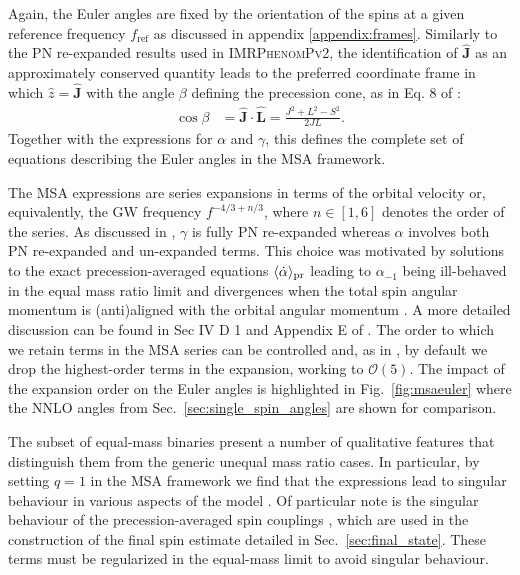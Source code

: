 \documentclass[%
aps,
prd,
amssymb,
amsmath,
amsfonts,
eqsecnum,
showpacs,
nofootinbib,
floatfix,
twocolumn,
twoside,
a4paper,
superscriptaddress
]{revtex4-1}
\newcommand{\bfJ}{\boldsymbol{J} \xspace}
\newcommand{\bfL}{\boldsymbol{L} \xspace}
\newcommand{\ppvtwo}{\textsc{IMRPhenomPv2}\xspace}
\begin{document}
Again, the Euler angles are fixed by the orientation of the spins at a given reference frequency $f_\mathrm{ref}$
as discussed in appendix \ref{appendix:frames}.
Similarly to the PN re-expanded results used in \ppvtwo, the identification of $\hat{\bfJ}$ as an approximately conserved quantity leads to the preferred coordinate frame in which $\hat{z} = \hat{\bfJ}$ with the angle $\beta$ defining the precession cone, as in Eq. 8 of \cite{Chatziioannou:2017tdw}:
\begin{align}
    \cos \beta &= \hat{\bfJ} \cdot \hat{\bfL} = \frac{J^2 + L^2 - S^2}{2 J L} .
\end{align}
Together with the expressions for $\alpha$ and $\gamma$, this defines the complete set of equations describing the Euler angles in the MSA framework. 

The MSA expressions are series expansions in terms of the orbital velocity or, equivalently, the GW frequency $f^{-4/3 + n/3}$, where $n \in \left[ 1 , 6 \right]$ denotes the order of the series. As discussed in \cite{Chatziioannou:2017tdw,Khan:2018fmp}, $\gamma$ is fully PN re-expanded whereas $\alpha$ involves both PN re-expanded and un-expanded terms. This choice was motivated by solutions to the exact precession-averaged equations $\langle \dot{\alpha} \rangle_{\rm{pr}}$ leading to $\alpha_{-1}$ being ill-behaved in the equal mass ratio limit and divergences when the total spin angular momentum is (anti)aligned with the orbital angular momentum \cite{Chatziioannou:2017tdw}. A more detailed discussion can be found in Sec IV D 1 and Appendix E of \cite{Chatziioannou:2017tdw}. The order to which we retain terms in the MSA series can be controlled and, as in \cite{Khan:2018fmp}, by default we drop the highest-order terms in the expansion, working to $\mathcal{O}(5)$. The impact of the expansion order on the Euler angles is highlighted in Fig.~\ref{fig:msaeuler} where the NNLO angles from Sec.~\ref{sec:single_spin_angles} are shown for comparison. 

The subset of equal-mass binaries present a number of qualitative features that distinguish them from the generic unequal mass ratio cases. In particular, by setting $q = 1$ in the MSA framework we find that the expressions lead to singular behaviour in various aspects of the model \cite{Kesden:2014sla,Gerosa:2015hba,Chatziioannou:2017tdw}. Of particular note is the singular behaviour of the precession-averaged spin couplings \cite{Chatziioannou:2017tdw}, which are used in the construction of the final spin estimate detailed in Sec.~\ref{sec:final_state}. These terms must be regularized in the equal-mass limit to avoid singular behaviour.    
\end{document}
